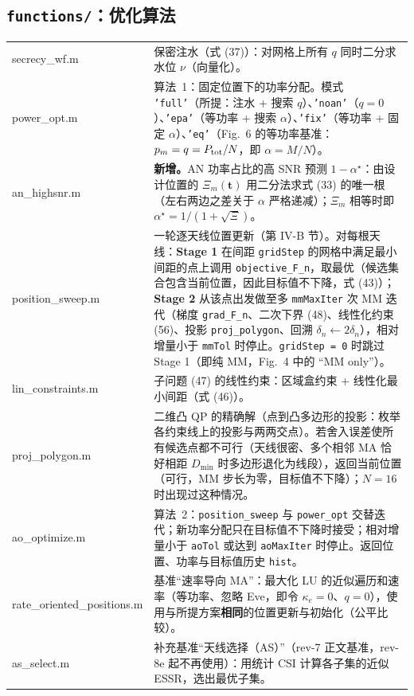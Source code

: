 \documentclass[11pt,a4paper]{ctexart}
\newcommand{\code}[1]{\texttt{#1}}
\newcommand{\Ptot}{P_{\rm tot}}
\begin{document}
\subsection{\code{functions/}：优化算法}
\begin{longtable}{>{\ttfamily\small}p{4.6cm}p{11.2cm}}
\toprule
secrecy\_wf.m & 保密注水（式 (37)）：对网格上所有 $q$ 同时二分求水位 $\nu$（向量化）。\\
power\_opt.m & 算法~1：固定位置下的功率分配。模式 \code{'full'}（所提：注水 + 搜索 $q$）、\code{'noan'}（$q=0$）、\code{'epa'}（等功率 + 搜索 $\alpha$）、\code{'fix'}（等功率 + 固定 $\alpha$）、\code{'eq'}（Fig.~6 的等功率基准：$p_m=q=\Ptot/N$，即 $\alpha=M/N$）。\\
an\_highsnr.m & \textbf{新增。}AN 功率占比的高 SNR 预测 $1-\alpha^\star$：由设计位置的 $\Xi_m(\mathbf t)$ 用二分法求式 (33) 的唯一根（左右两边之差关于 $\alpha$ 严格递减）；$\Xi_m$ 相等时即 $\alpha^\star=1/(1+\sqrt\Xi)$。\\
position\_sweep.m & 一轮逐天线位置更新（第 IV-B 节）。对每根天线：\textbf{Stage 1} 在间距 \code{gridStep} 的网格中满足最小间距的点上调用 \code{objective\_F\_n}，取最优（候选集合包含当前位置，因此目标值不下降，式 (43)）；\textbf{Stage 2} 从该点出发做至多 \code{mmMaxIter} 次 MM 迭代（梯度 \code{grad\_F\_n}、二次下界 (48)、线性化约束 (56)、投影 \code{proj\_polygon}、回溯 $\delta_n\leftarrow2\delta_n$），相对增量小于 \code{mmTol} 时停止。\code{gridStep = 0} 时跳过 Stage 1（即纯 MM，Fig.~4 中的 “MM only”）。\\
lin\_constraints.m & 子问题 (47) 的线性约束：区域盒约束 + 线性化最小间距（式 (46)）。\\
proj\_polygon.m & 二维凸 QP 的精确解（点到凸多边形的投影：枚举各约束线上的投影与两两交点）。若舍入误差使所有候选点都不可行（天线很密、多个相邻 MA 恰好相距 $D_{\min}$ 时多边形退化为线段），返回当前位置（可行，MM 步长为零，目标值不下降）；$N=16$ 时出现过这种情况。\\
ao\_optimize.m & 算法~2：\code{position\_sweep} 与 \code{power\_opt} 交替迭代；新功率分配只在目标值不下降时接受；相对增量小于 \code{aoTol} 或达到 \code{aoMaxIter} 时停止。返回位置、功率与目标值历史 \code{hist}。\\
rate\_oriented\_positions.m & 基准“速率导向 MA”：最大化 LU 的近似遍历和速率（等功率、忽略 Eve，即令 $\kappa_e=0$、$q=0$），使用与所提方案\textbf{相同}的位置更新与初始化（公平比较）。\\
as\_select.m & 补充基准“天线选择（AS）”（rev-7 正文基准，rev-8e 起不再使用）：用统计 CSI 计算各子集的近似 ESSR，选出最优子集。\\

\end{longtable}
\end{document}
